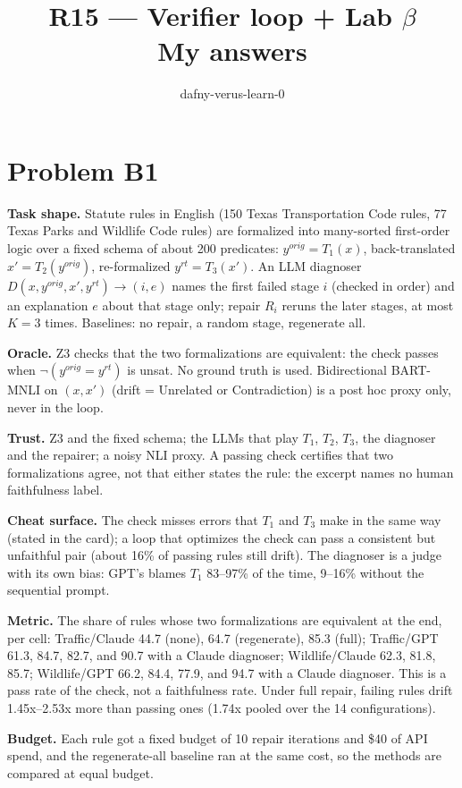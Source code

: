 \documentclass[11pt]{article}
\title{R15 --- Verifier loop + Lab $\beta$ \\ \large My answers}
\author{dafny-verus-learn-0}
\date{}
\begin{document}
\maketitle
\sloppy
\section*{Problem B1}\label{ans:B1}
\begin{answer}
\textbf{Task shape.} Statute rules in English (150 Texas Transportation Code
rules, 77 Texas Parks and Wildlife Code rules) are formalized into many-sorted
first-order logic over a fixed schema of about 200 predicates:
$y^{orig}=T_1(x)$, back-translated $x'=T_2(y^{orig})$, re-formalized
$y^{rt}=T_3(x')$. An LLM diagnoser $D(x,y^{orig},x',y^{rt})\to(i,e)$ names the
first failed stage $i$ (checked in order) and an explanation $e$ about that
stage only; repair $R_i$ reruns the later stages, at most $K=3$ times.
Baselines: no repair, a random stage, regenerate all.

\textbf{Oracle.} Z3 checks that the two formalizations are equivalent: the
check passes when $\neg(y^{orig}=y^{rt})$ is unsat. No ground truth is used.
Bidirectional BART-MNLI on $(x,x')$ (drift = Unrelated or Contradiction) is a
post hoc proxy only, never in the loop.

\textbf{Trust.} Z3 and the fixed schema; the LLMs that play $T_1$, $T_2$,
$T_3$, the diagnoser and the repairer; a noisy NLI proxy. A passing check
certifies that two formalizations agree, not that either states the rule: the
excerpt names no human faithfulness label.

\textbf{Cheat surface.} The check misses errors that $T_1$ and $T_3$ make in
the same way (stated in the card); a loop that optimizes the check can pass a
consistent but unfaithful pair (about 16\% of passing rules still drift). The
diagnoser is a judge with its own bias: GPT's blames $T_1$ 83--97\% of the
time, 9--16\% without the sequential prompt.

\textbf{Metric.} The share of rules whose two formalizations are equivalent at
the end, per cell: Traffic/Claude 44.7 (none), 64.7 (regenerate), 85.3 (full);
Traffic/GPT 61.3, 84.7, 82.7, and 90.7 with a Claude diagnoser;
Wildlife/Claude 62.3, 81.8, 85.7; Wildlife/GPT 66.2, 84.4, 77.9, and 94.7 with
a Claude diagnoser. This is a pass rate of the check, not a faithfulness rate.
Under full repair, failing rules drift 1.45x--2.53x more than passing ones
(1.74x pooled over the 14 configurations).

\textbf{Budget.} Each rule got a fixed budget of 10 repair iterations and
\$40 of API spend, and the regenerate-all baseline ran at the same cost, so the
methods are compared at equal budget.


\end{answer}
\end{document}
